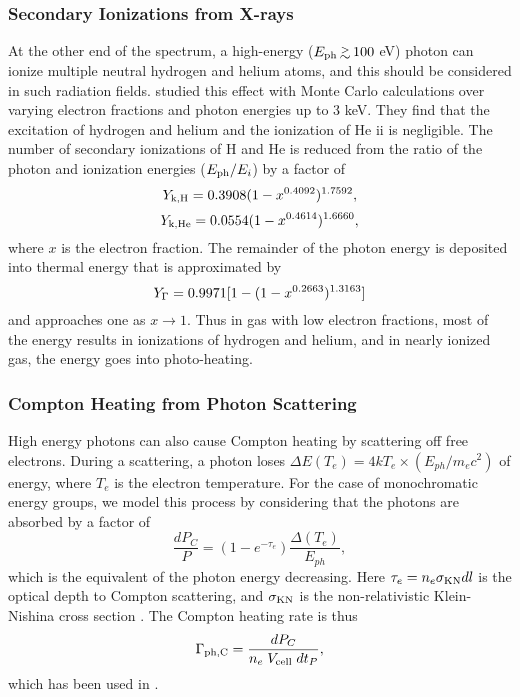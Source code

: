\documentclass[useAMS,usenatbib]{mn2e}
\begin{document}
\subsubsection{Secondary Ionizations from X-rays}
\label{sec:xrays}

At the other end of the spectrum, a high-energy ($E_{\rm ph} \gsim
100$ eV) photon can ionize multiple neutral hydrogen and helium atoms,
and this should be considered in such radiation fields.
\citet{Shull85} studied this effect with Monte Carlo calculations over
varying electron fractions and photon energies up to 3 keV.  They find
that the excitation of hydrogen and helium and the ionization of
He {\sc ii} is negligible.  The number of secondary ionizations of H
and He is reduced from the ratio of the photon and ionization energies
($E_{\rm ph} / E_i$) by a factor of
%
\begin{equation}
  Y_{\rm k,H} = 0.3908 (1 - x^{0.4092})^{1.7592},
\end{equation}
\begin{equation}
  Y_{\rm k,He} = 0.0554 (1 - x^{0.4614})^{1.6660},
\end{equation}
where $x$ is the electron fraction.  The remainder of the photon
energy is deposited into thermal energy that is approximated by
%
\begin{equation}
  Y_{\rm \Gamma} = 0.9971 [ 1 - (1 - x^{0.2663})^{1.3163} ]
\end{equation}
and approaches one as $x \rightarrow 1$.  Thus in gas with low
electron fractions, most of the energy results in ionizations of
hydrogen and helium, and in nearly ionized gas, the energy goes into
photo-heating.

\subsubsection{Compton Heating from Photon Scattering}

High energy photons can also cause Compton heating by scattering off
free electrons.  During a scattering, a photon loses $\Delta E(T_e) =
4kT_e \times (E_{ph} / m_e c^2)$ of energy, where $T_e$ is the
electron temperature.  For the case of monochromatic energy groups, we
model this process by considering that the photons are absorbed by a
factor of 
\begin{equation}
  \frac{dP_C}{P} = (1 - e^{-\tau_e}) \frac{\Delta(T_e)}{E_{ph}},
\end{equation}
which is the equivalent of the photon energy decreasing.  Here $\tau_e
= n_e \sigma_{\rm KN} dl$ is the optical depth to Compton scattering,
and $\sigma_{\rm KN}$ is the non-relativistic Klein-Nishina cross
section \citep{Rybicki}.  The Compton heating rate is thus
\begin{equation}
  \Gamma_{\rm ph,C} = \frac{dP_C}{n_e \; V_{\rm cell} \; dt_P},
\end{equation}
which has been used in \citet{Kim11}.
\end{document}
